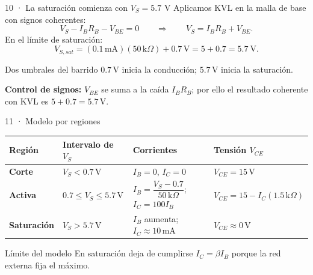 \documentclass[aspectratio=169]{beamer}
\begin{document}
\begin{frame}{10 · La saturación comienza con $V_S=5.7$ V}
  Aplicamos KVL en la malla de base con signos coherentes:
  \[
    V_S-I_B R_B-V_{BE}=0
    \qquad\Longrightarrow\qquad
    V_S=I_B R_B+V_{BE}.
  \]
  En el límite de saturación:
  \[
    V_{S,sat}
      =(0.1\,\mathrm{mA})(50\,\mathrm{k}\Omega)+0.7\,\mathrm{V}
      =5+0.7
      =\SI{5.7}{\volt}.
  \]
  \begin{block}{Dos umbrales del barrido}
    $0.7\,\mathrm{V}$ inicia la conducción; $5.7\,\mathrm{V}$ inicia la saturación.
  \end{block}
  {\small\textbf{Control de signos:} $V_{BE}$ se suma a la caída $I_BR_B$; por ello
  el resultado coherente con KVL es $5+0.7=5.7\,\mathrm{V}$.}
\end{frame}

\begin{frame}{11 · Modelo por regiones}
  \begin{table}
    \footnotesize
    \setlength{\tabcolsep}{3pt}
    \renewcommand{\arraystretch}{1.18}
    \begin{tabular}{>{\raggedright\arraybackslash}p{}
                    >{\raggedright\arraybackslash}p{}
                    >{\raggedright\arraybackslash}p{}
                    >{\raggedright\arraybackslash}p{}}
      \toprule
      Región & Intervalo de $V_S$ & Corrientes & Tensión $V_{CE}$ \\
      \midrule
      \textbf{Corte} & $V_S<0.7\,\mathrm{V}$
        & $I_B=0$, $I_C=0$
        & $V_{CE}=15\,\mathrm{V}$ \\
      \textbf{Activa} & $0.7\le V_S\le5.7\,\mathrm{V}$
        & $I_B=\dfrac{V_S-0.7}{50\,\mathrm{k}\Omega}$;\newline
          $I_C=100I_B$
        & $V_{CE}=15-I_C(1.5\,\mathrm{k}\Omega)$ \\
      \textbf{Saturación} & $V_S>5.7\,\mathrm{V}$
        & $I_B$ aumenta; $I_C\approx10\,\mathrm{mA}$
        & $V_{CE}\approx0\,\mathrm{V}$ \\
      \bottomrule
    \end{tabular}
  \end{table}
  \begin{block}{Límite del modelo}
    En saturación deja de cumplirse $I_C=\beta I_B$ porque la red externa fija el máximo.
  \end{block}
\end{frame}
\end{document}
